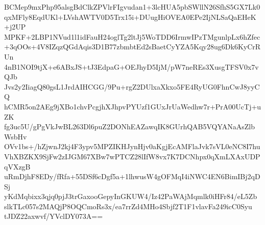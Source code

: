 BCMep9mxPhp95alsgBdClkZPVlrFIgvudan1+3lcHUA5pbSWllN26SfhS5GX7Lk0
qxMFly8EqdUKl+LVshAWTV0D5Trx15i+DUugHiOVEA0EPe2IjNLSaQaEHeK+j2UP
MPKF+2LBP1NVud1l1idFauH24oglTg2ltJj5WoTDD6IrmwIPzTMgunlpLx6hZfec
+3qOOs+4V8IZqzQGdAqis3D1B77zbmbtEd2sBaetCyYZA5Kqy28ug6Dk6KyCrRUn
4nB1NOI9tjX+e6ABxJS+tJ3EdpaG+OEJhyD5IjM/pW7neREs3XusgTFSV0x7vQJb
Jvs2y2IiagQ80gsL1JrdAIHCGG/9Pu+rgZ2DUlxaXkxo5FE4RyUG0FhnCwJ8yyCQ
hCMR5on2AEg9jXBo1chvPcgjhXJhpvPYUzf1GUxJrUaWedhw7r+PrA00UcTj+uZK
fg3uc5U/gPgVkJwBL263Dl6puZ2DONhEAZawqIK8GUrhQAB5VQYANaAsZlbWsbHv
OVv1bs+/hZjwnJ2kj4F3ypv5MPZIKHJynHjv0aKgjEcAMFlaJvk7sVL0eNC8I7hu
VhXBZKX9SjFw2zIJGM67XBw7wPTCZ28lIfW8vx7K7DCNhpx0qXmLXAxUDPqVXzgB
uRmDjhF8EDy/fRfa+55DSf6cDgf5a+1lhwusW4gOFMqI4iNWC4EN6BimIBj2qDSj
yKdMqbixx3qjq0pjJ3trGaxooGepyInGKUW4/Iz42PaWAjMqmlk0iHFr84/eL5Zb
slkTLc057s2MAQjP8OQCmoRs3x/ea7rrZd4MHo4Sbjf2T1F1vlavFa249icC0Syu
tJDZ22axwvf/YVclDY073A==
